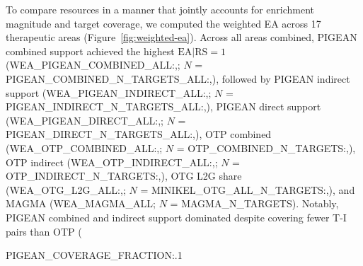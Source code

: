 To compare resources in a manner that jointly accounts for enrichment magnitude and target coverage, we computed the weighted EA across 17 therapeutic areas (Figure~\ref{fig:weighted-ea}). Across all areas combined, PIGEAN combined support achieved the highest $\text{EA}|\text{RS}{=}1$ ({{WEA_PIGEAN_COMBINED_ALL:,}}; $N$ = {{PIGEAN_COMBINED_N_TARGETS_ALL:,}}), followed by PIGEAN indirect support ({{WEA_PIGEAN_INDIRECT_ALL:,}}; $N$ = {{PIGEAN_INDIRECT_N_TARGETS_ALL:,}}), PIGEAN direct support ({{WEA_PIGEAN_DIRECT_ALL:,}}; $N$ = {{PIGEAN_DIRECT_N_TARGETS_ALL:,}}), OTP combined ({{WEA_OTP_COMBINED_ALL:,}}; $N$ = {{OTP_COMBINED_N_TARGETS:,}}), OTP indirect ({{WEA_OTP_INDIRECT_ALL:,}}; $N$ = {{OTP_INDIRECT_N_TARGETS:,}}), OTG L2G share ({{WEA_OTG_L2G_ALL:,}}; $N$ = {{MINIKEL_OTG_ALL_N_TARGETS:,}}), and MAGMA ({{WEA_MAGMA_ALL}}; $N$ = {{MAGMA_N_TARGETS}}). Notably, PIGEAN combined and indirect support dominated despite covering fewer T-I pairs than OTP ({{PIGEAN_COVERAGE_FRACTION:.1%

}}
